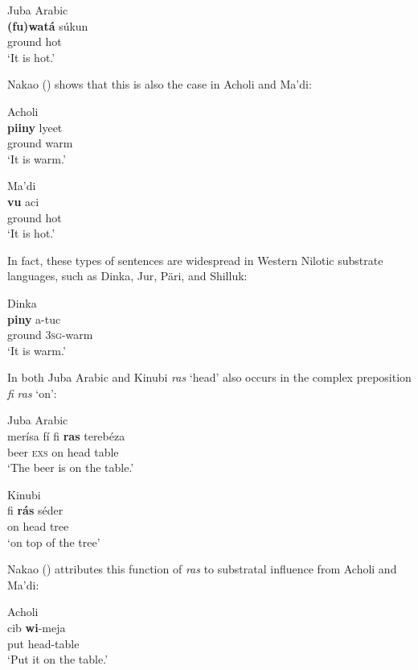 \documentclass[output=paper]{langsci/langscibook}
\begin{document}
\ea\label{ex:key:}
{Juba Arabic \citep[141]{Nakao2012}}\\
\gll   \textbf{(fu)watá} súkun\\
       ground hot\\
\glt     `It is hot.'
\z

Nakao (\citeyear[141]{Nakao2012}) shows that this is also the case in Acholi and Ma'di:

\ea\label{ex:key:}
{Acholi \citep[141]{Nakao2012}}\\
\gll \textbf{piiny} lyeet\\
     ground warm\\
\glt     `It is warm.'
\z

\ea\label{ex:key:}
{Ma'di \citep[141]{Nakao2012}}\\
\gll \textbf{vu} aci\\
     ground hot\\
\glt     `It is hot.'
\z

In fact, these types of sentences are widespread in Western Nilotic substrate languages, such as Dinka, Jur, Päri, and Shilluk:

\ea\label{ex:key:}
{Dinka \citep[202]{Nebel1979}}\\
\gll            \textbf{piny} a-tuc\\
                ground 3\textsc{sg}-warm\\
\glt     `It is warm.'
\z

  In both Juba Arabic and Kinubi \textit{ras} ‘head’ also occurs in the complex preposition \textit{fi} \textit{ras} ‘on’:

\ea\label{ex:key:}
\ea Juba Arabic \citep[141]{Nakao2012}\\
\gll     merísa fí fi \textbf{ras} terebéza\\
         beer \textsc{exs} on head table\\
\glt       `The beer is on the table.'

\ex\label{ex:key:}
Kinubi \citep[159]{Wellens2003}\\
\gll     fi \textbf{rá}\textbf{s} séder\\
         on head tree\\
\glt       `on top of the tree'
\z
\z

Nakao (\citeyear[141]{Nakao2012}) attributes this function of \textit{ras} to substratal influence from Acholi and Ma'di:

\ea\label{ex:key:}
{Acholi \citep[141]{Nakao2012}}\\
\gll            cib \textbf{wi}-meja\\
                put head-table\\
\glt     `Put it on the table.'
\z
 
\end{document}
